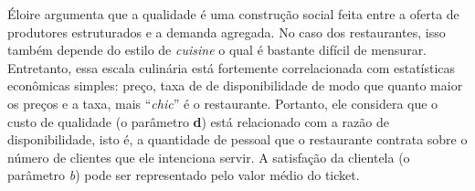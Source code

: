 \documentclass[a4paper, 12pt, openright, oneside, german, french, english, brazil]{abntex2}
\begin{document}
	
	Éloire argumenta que a qualidade é uma construção social feita entre a oferta de produtores estruturados e a demanda agregada. No caso dos restaurantes, isso também depende do estilo de \textit{cuisine} o qual é bastante difícil de mensurar. Entretanto, essa escala culinária está fortemente correlacionada com estatísticas econômicas simples: preço, taxa de de disponibilidade de modo que quanto maior os preços e a taxa, mais ``\textit{chic}'' é o restaurante. Portanto, ele considera que o custo de qualidade (o parâmetro \textbf{d}) está relacionado com a razão de disponibilidade, isto é, a quantidade de pessoal que o restaurante contrata sobre o número de clientes que ele intenciona servir. A satisfação da clientela (o parâmetro \textit{b}) pode ser representado pelo valor médio do ticket.
	
	
\end{document}
